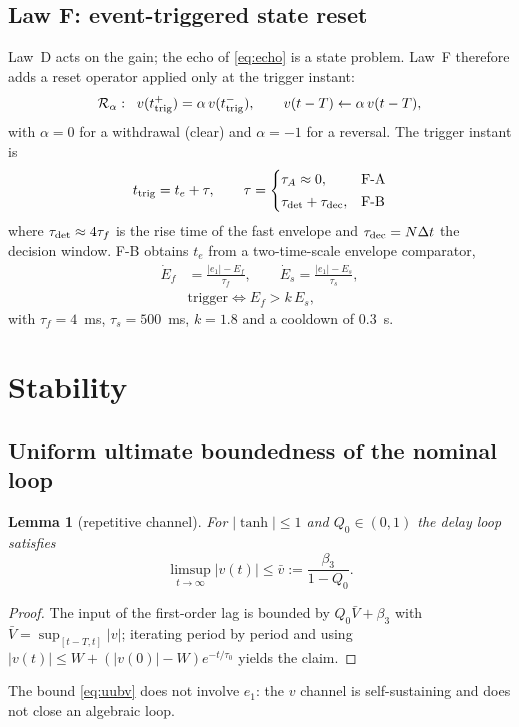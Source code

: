 \documentclass[journal]{IEEEtran}
\newtheorem{lemma}{Lemma}
\theoremstyle{remark}
\newcommand{\st}{\operatorname{tanh}}
\begin{document}
\subsection{Law F: event-triggered state reset}\label{sec:lawf}
Law~D acts on the gain; the echo of \eqref{eq:echo} is a state problem. Law~F
therefore adds a reset operator applied only at the trigger instant:
\begin{equation}
\mathcal R_\alpha:\;\; v(t_{\rm trig}^+)=\alpha\,v(t_{\rm trig}^-),\qquad
v(t-T)\leftarrow\alpha\,v(t-T),
\label{eq:reset}
\end{equation}
with $\alpha=0$ for a withdrawal (clear) and $\alpha=-1$ for a reversal. The trigger
instant is
\begin{equation}
t_{\rm trig}=t_e+\tau,\qquad
\tau=\begin{cases}\tau_A\approx0, & \text{F-A}\\[0.6mm]
\tau_{\rm det}+\tau_{\rm dec}, & \text{F-B}\end{cases}
\label{eq:trig}
\end{equation}
where $\tau_{\rm det}\approx4\tau_f$ is the rise time of the fast envelope and
$\tau_{\rm dec}=N\Delta t$ the decision window. F-B obtains $t_e$ from a two-time-scale
envelope comparator,
\begin{equation}
\begin{aligned}
\dot E_f&=\frac{|e_1|-E_f}{\tau_f},\qquad \dot E_s=\frac{|e_1|-E_s}{\tau_s},\\
&\text{trigger}\iff E_f>k\,E_s ,
\end{aligned}
\label{eq:envelope}
\end{equation}
with $\tau_f=4$~ms, $\tau_s=500$~ms, $k=1.8$ and a cooldown of $0.3$~s.

\section{Stability}\label{sec:stab}
\subsection{Uniform ultimate boundedness of the nominal loop}
\begin{lemma}[repetitive channel]\label{lem:v}
For $|\st|\le1$ and $Q_0\in(0,1)$ the delay loop satisfies
\begin{equation}
\limsup_{t\to\infty}|v(t)|\le\bar v:=\frac{\beta_3}{1-Q_0}.
\label{eq:uubv}
\end{equation}
\end{lemma}
\begin{proof}
The input of the first-order lag is bounded by $Q_0\bar V+\beta_3$ with
$\bar V=\sup_{[t-T,t]}|v|$; iterating period by period and using
$|v(t)|\le W+(|v(0)|-W)e^{-t/\tau_0}$ yields the claim.
\end{proof}
The bound \eqref{eq:uubv} does not involve $e_1$: the $v$ channel is self-sustaining
and does not close an algebraic loop.
\end{document}
